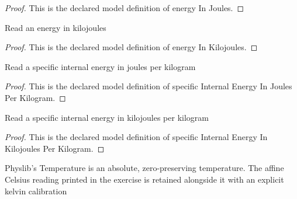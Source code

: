 \begin{proof}
  This is the declared model definition of energy In Joules.
\end{proof}
\begin{definition}
  \label{def:physics:phyx-mini-0464:phyxminiproblems-problemphyxmini0464-energyinkilojoules}
  Read an energy in kilojoules
\end{definition}
\begin{proof}
  This is the declared model definition of energy In Kilojoules.
\end{proof}
\begin{definition}
  \label{def:physics:phyx-mini-0464:phyxminiproblems-problemphyxmini0464-specificinternalenergyinjoulesperkilogram}
  Read a specific internal energy in joules per kilogram
\end{definition}
\begin{proof}
  This is the declared model definition of specific Internal Energy In Joules Per Kilogram.
\end{proof}
\begin{definition}
  \label{def:physics:phyx-mini-0464:phyxminiproblems-problemphyxmini0464-specificinternalenergyinkilojoulesperkilogram}
  Read a specific internal energy in kilojoules per kilogram
\end{definition}
\begin{proof}
  This is the declared model definition of specific Internal Energy In Kilojoules Per Kilogram.
\end{proof}
\begin{definition}
  \label{def:physics:phyx-mini-0464:phyxminiproblems-problemphyxmini0464-celsiustemperaturereading}
  Physlib's Temperature is an absolute, zero-preserving temperature. The affine Celsius reading printed in the exercise is retained alongside it with an explicit kelvin calibration
\end{definition}
